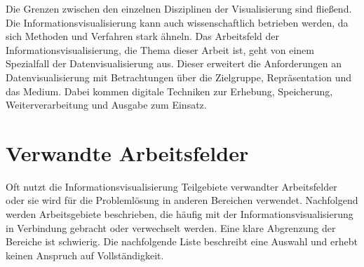 \documentclass[a4paper, 
               12pt,
               DIV=calc,
               version=first,
               pdftex,
               headsepline,
               footsepline,
               bibtotocnumbered,
               liststotocnumbered]{scrreprt}
\begin{document}
Die Grenzen zwischen den einzelnen Disziplinen der Visualisierung sind fließend. Die Informationsvisualisierung kann
auch wissenschaftlich betrieben werden, da sich Methoden und Verfahren stark ähneln.
Das Arbeitsfeld der Informationsvisualisierung, die Thema dieser Arbeit ist,
geht von einem Spezialfall der Datenvisualisierung aus. Dieser erweitert die Anforderungen an Datenvisualisierung mit
Betrachtungen über die Zielgruppe, Repräsentation und das Medium. Dabei kommen digitale
Techniken zur Erhebung, Speicherung, Weiterverarbeitung und Ausgabe zum Einsatz.

\section{Verwandte Arbeitsfelder}
\label{sec:Arbeitsfelder}
Oft nutzt die Informationsvisualisierung Teilgebiete verwandter Arbeitsfelder oder sie wird für die Problemlösung
in anderen Bereichen verwendet.
Nachfolgend werden Arbeitsgebiete beschrieben, die häufig mit der Informationsvisualisierung in Verbindung
gebracht oder verwechselt werden. Eine klare Abgrenzung der Bereiche ist schwierig. Die nachfolgende Liste beschreibt
eine Auswahl und erhebt keinen Anspruch auf Vollständigkeit.
\end{document}
